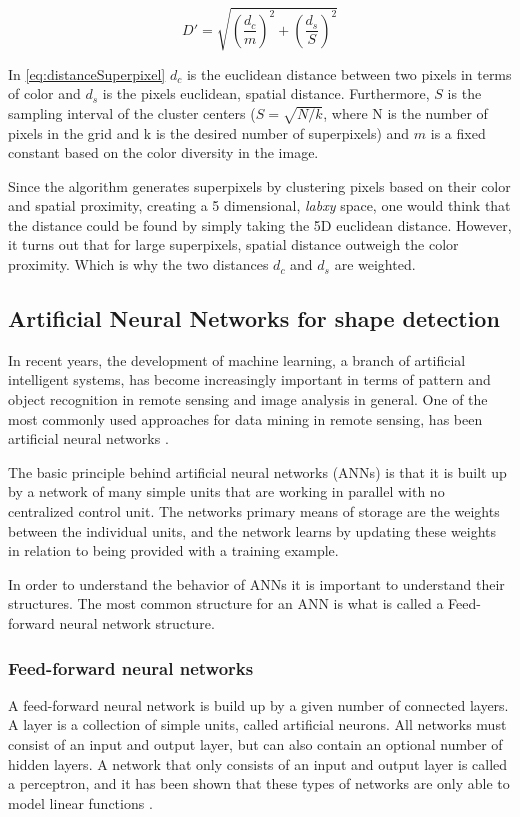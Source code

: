 \begin{equation}
	D'=\sqrt{\left(\frac{d_{c}}{m}\right)^{2} + \left(\frac{d_{s}}{S}\right)^{2}}
	\label{eq:distanceSuperpixel}
\end{equation}

In \autoref{eq:distanceSuperpixel} $d_{c}$ is the euclidean distance between two pixels in terms of color and $d_{s}$ is the pixels euclidean, spatial distance. Furthermore, $S$ is the sampling interval of the cluster centers ($S = \sqrt{N/k}$, where N is the number of pixels in the grid and k is the desired number of superpixels) and $m$ is a fixed constant based on the color diversity in the image.

Since the algorithm generates superpixels by clustering pixels based on their color and spatial proximity, creating a 5 dimensional, \textit{labxy} space, one would think that the distance could be found by simply taking the 5D euclidean distance. However, it turns out that for large superpixels, spatial distance outweigh the color proximity. Which is why the two distances $d_{c}$ and $d_{s}$ are weighted.

\subsection{Artificial Neural Networks for shape detection}
In recent years, the development of machine learning, a branch of artificial intelligent systems, has become increasingly important in terms of pattern and object recognition in remote sensing and image analysis in general. One of the most commonly used approaches for data mining in remote sensing, has been artificial neural networks \cite{Lary2016}.

The basic principle behind artificial neural networks (ANNs) is that it is built up by a network of many simple units that are working in parallel with no centralized control unit. The networks primary means of storage are the weights between the individual units, and the network learns by updating these weights in relation to being provided with a training example.

In order to understand the behavior of ANNs it is important to understand their structures. The most common structure for an ANN is what is called a Feed-forward neural network structure.

\subsubsection{Feed-forward neural networks}
A feed-forward neural network is build up by a given number of connected layers. A layer is a collection of simple units, called artificial neurons. All networks must consist of an input and output layer, but can also contain an optional number of hidden layers. A network that only consists of an input and output layer is called a perceptron, and it has been shown that these types of networks are only able to model linear functions \citep{Minsky1969}.

